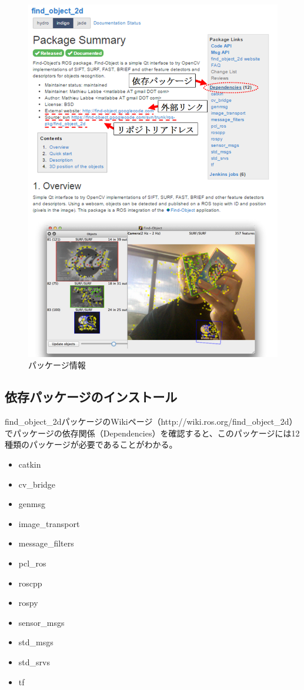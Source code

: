 \begin{figure}[htp]
  \centering
  \includegraphics[width=15cm]{pictures/chapter7/pic_07_06.png}
  \caption{パッケージ情報}
\end{figure}

\subsection{依存パッケージのインストール}

find\_object\_2dパッケージのWikiページ（http://wiki.ros.org/find\_object\_2d）でパッケージの依存関係（Dependencies）を確認すると、このパッケージには12種類のパッケージが必要であることがわかる。

\begin{itemize}
\item catkin
\item cv\_bridge
\item genmsg
\item image\_transport
\item message\_filters
\item pcl\_ros
\item roscpp
\item rospy
\item sensor\_msgs
\item std\_msgs
\item std\_srvs
\item tf
\end{itemize}

